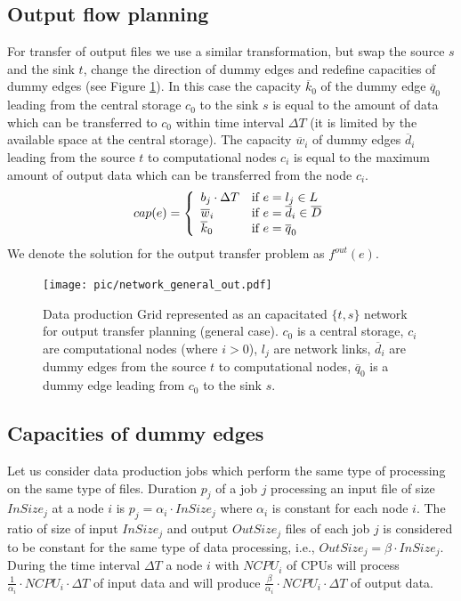 \documentclass{svjour3}                     %
\begin{document}
\subsection{Output flow planning}
\label{outproblem}
For transfer of output files we use a similar transformation, but swap the
source $s$ and the sink $t$, change the direction of dummy edges and redefine
capacities of dummy edges (see Figure \ref{general_out}). In this case the capacity $\overline{k}_{0}$ of the
dummy edge $\overline{q}_{0}$ leading from the central storage $c_0$ to the
sink $s$ is equal to the amount of data which can be transferred to $c_0$
within time interval $\Delta T$ (it is limited by the available space at the
central storage). The capacity $\overline{w}_{i}$ of dummy edges
$\overline{d}_{i}$ leading from the source $t$ to computational nodes $c_{i}$
is equal to the maximum amount of output data which can be transferred from
the node $c_{i}$.
%
\begin{equation}
\label{edge_cap_out}
cap(e) = \left\{ 
  \begin{array}{l l}
    b_{j} \cdot \Delta T & \text{if }e = l_{j} \in L \\
    \overline{w}_{i} & \text{if } e = \overline{d}_{i} \in \overline{D}\\
    \overline{k}_{0} & \text{if } e = \overline{q}_{0}
  \end{array} \right.
\end{equation}
%
We denote the solution for the output transfer problem as $f^{out}(e)$.
\begin{figure}[b]
	\begin{center}
		\texttt{[image: pic/network\_general\_out.pdf]}
	\end{center}
	\caption{Data production Grid represented as an capacitated $\{t,s\}$ network for output transfer planning (general case). $c_{0}$ is a central storage, $c_{i}$ are computational nodes (where $i>0$), $l_{j}$ are network links, $\overline{d}_{i}$ are dummy edges from the source $t$ to computational nodes, $\overline{q}_{0}$ is a dummy edge leading from $c_{0}$ to the sink $s$. }
	\label{general_out}	
\end{figure}

\subsection{Capacities of dummy edges}

Let us consider data production jobs which perform the same type of processing
on the same type of files. Duration $p_{j}$ of a job $j$  processing an input
file of size $InSize_{j}$ at a node $i$ is $p_{j} = \alpha_{i} \cdot
InSize_{j}$ where $\alpha_{i}$ is constant for each node $i$.  The ratio of
size of input $InSize_{j}$ and output $OutSize_{j}$ files of each job $j$ is
considered to be constant for the same type of data processing, i.e.,
$OutSize_{j} = \beta \cdot InSize_{j}$.  During the time interval $\Delta T$ a
node $i$ with $NCPU_{i}$  of CPUs  will process $\frac{1}{\alpha_{i}} \cdot
NCPU_{i} \cdot \Delta T$ of input data and will produce
$\frac{\beta}{\alpha_{i}} \cdot NCPU_{i} \cdot \Delta T$ of output data.
\end{document}
